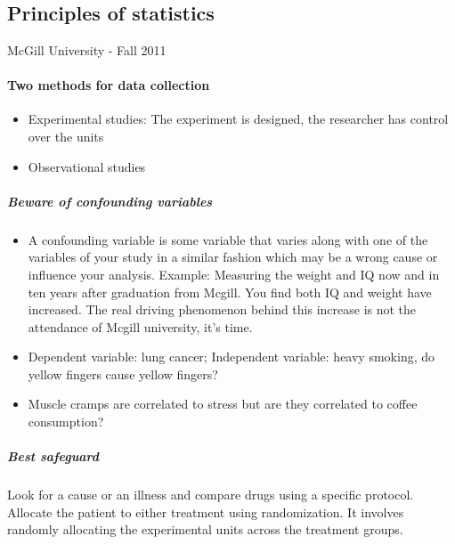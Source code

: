 \documentclass[9pt, letterpaper, oneside]{article}
\date{}
\begin{document}

\section*{}
\begin{center}
\section*{Principles of statistics}
\small{McGill University - Fall 2011} 
\end{center}


\paragraph{Two methods for data collection}

\begin{itemize}
\item Experimental studies: The experiment is designed, the researcher has control over the units
\item Observational studies
\end{itemize}

\subparagraph{Beware of confounding variables}
\begin{itemize}
\item A confounding variable is some variable that varies along with one of the variables of your study in a similar fashion which may be a wrong cause or influence your analysis. Example: Measuring the weight and IQ now and in ten years after graduation from Mcgill. You find both IQ and weight have increased. The real driving phenomenon behind this increase is not the attendance of Mcgill university, it's time.
\item Dependent variable: lung cancer; Independent variable: heavy smoking, do yellow fingers cause yellow fingers?
\item Muscle cramps are correlated to stress but are they correlated to coffee consumption?
\end{itemize}

\subparagraph{Best safeguard}
Look for a cause or an illness and compare drugs using a specific protocol. Allocate the patient to either treatment using randomization. It involves randomly allocating the experimental units across the treatment groups.
\end{document}
